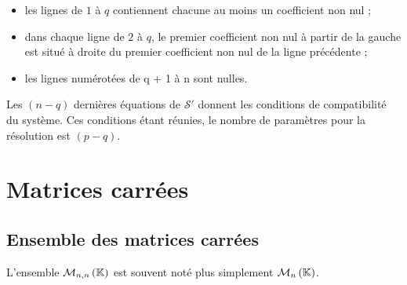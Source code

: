 \begin{defprop}
\begin{itemize}
\begin{itemize}
            \item  les lignes de \(1\) à \(q\) contiennent chacune au moins un coefficient non nul ;
            \item dans chaque ligne de \(2\) à \(q\), le premier coefficient non nul à partir de la gauche est situé à droite du premier coefficient non nul de la ligne précédente ;
            \item les lignes numérotées de q + 1 à n sont nulles.
        \end{itemize}
        Les \((n - q)\) dernières équations de \(\mathcal{S}'\) donnent les conditions de compatibilité du système. Ces conditions étant réunies, le nombre de paramètres pour la résolution est \((p - q)\).
    \end{itemize}
\end{defprop}

\section{Matrices carrées}
\subsection{Ensemble des matrices carrées}
\begin{defi}
    L’ensemble \(\mathcal{M}_{n,n}\left(\mathbb{K}\right)\) est souvent noté plus simplement \(\mathcal{M}_n\left(\mathbb{K}\right)\).
\end{defi}

